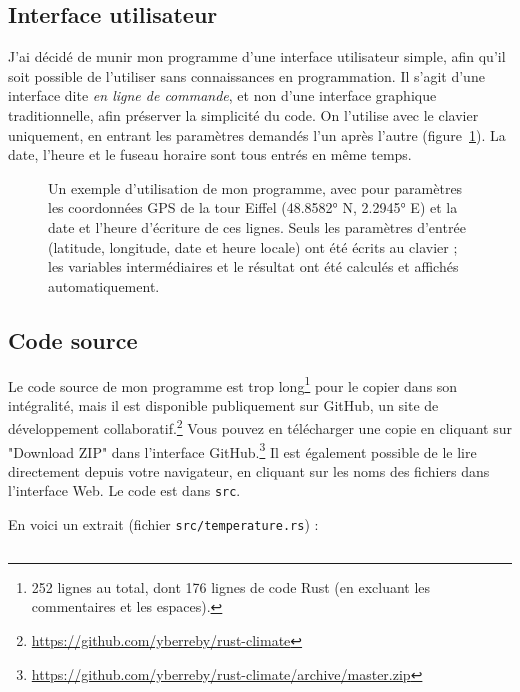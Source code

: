 \documentclass[12pt]{article}
\begin{document}
\subsection{Interface utilisateur}

J'ai décidé de munir mon programme d'une interface utilisateur simple, afin qu'il soit possible de l'utiliser sans connaissances en programmation. Il s'agit d'une interface dite \emph{en ligne de commande}, et non d'une interface graphique traditionnelle, afin préserver la simplicité du code. On l'utilise avec le clavier uniquement, en entrant les paramètres demandés l'un après l'autre (figure~\ref{fig:demo}). La date, l'heure et le fuseau horaire sont tous entrés en même temps.

\begin{figure}[!htbp]
  \centering
  \caption{Un exemple d'utilisation de mon programme, avec pour paramètres les coordonnées GPS de la tour Eiffel (48.8582° N, 2.2945° E) et la date et l'heure d'écriture de ces lignes. Seuls les paramètres d'entrée (latitude, longitude, date et heure locale) ont été écrits au clavier ; les variables intermédiaires et le résultat ont été calculés et affichés automatiquement.}
  \label{fig:demo}
\end{figure}


\FloatBarrier
\subsection{Code source}

Le code source de mon programme est trop long\footnote{252 lignes au total, dont 176 lignes de code Rust (en excluant les commentaires et les espaces).} pour le copier dans son intégralité, mais il est disponible publiquement sur GitHub, un site de développement collaboratif.\footnote{\url{https://github.com/yberreby/rust-climate}}
Vous pouvez en télécharger une copie en cliquant sur "Download ZIP" dans l'interface GitHub.\footnote{\url{https://github.com/yberreby/rust-climate/archive/master.zip}}
Il est également possible de le lire directement depuis votre navigateur, en cliquant sur les noms des fichiers dans l'interface Web.
Le code est dans \texttt{src}.

En voici un extrait (fichier \texttt{src/temperature.rs}) :

\inputminted[linenos]{rust}{rust-climate/src/temperature.rs}
\end{document}
